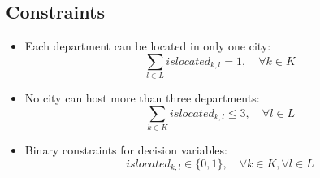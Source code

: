 \documentclass{article}
\begin{document}
\subsection*{Constraints}
\begin{itemize}
    \item Each department can be located in only one city:
    \[
    \sum_{l \in L} islocated_{k, l} = 1, \quad \forall k \in K
    \]
    
    \item No city can host more than three departments:
    \[
    \sum_{k \in K} islocated_{k, l} \leq 3, \quad \forall l \in L
    \]
    
    \item Binary constraints for decision variables:
    \[
    islocated_{k, l} \in \{0, 1\}, \quad \forall k \in K, \forall l \in L
    \]
\end{itemize}
\end{document}

